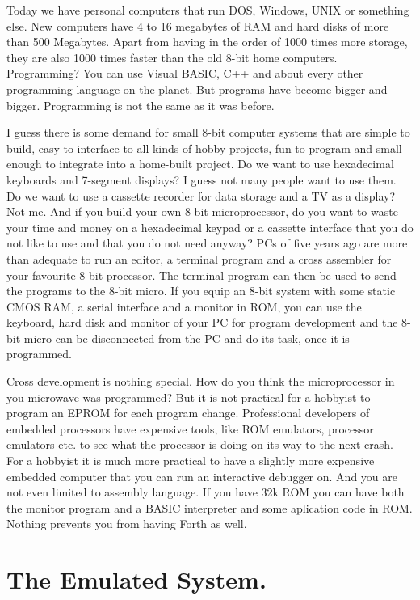 Today we have personal computers that run DOS, Windows, UNIX or something
else. New computers have 4 to 16 megabytes of RAM and hard disks of more
than 500 Megabytes. Apart from having in the order of 1000 times more
storage, they are also 1000 times faster than the old 8-bit home computers. 
Programming? You can use Visual BASIC, C++ and about
every other programming language on the planet. But programs have become
bigger and bigger. Programming is not the same as it was before. 

I guess there is some demand for small 8-bit computer systems that are simple
to build, easy to interface to all kinds of hobby projects, fun to program
and small enough to integrate into a home-built project.
Do we want to use hexadecimal keyboards and 7-segment displays? I guess not
many people want to use them. Do we want to use a cassette recorder for data
storage and a TV as a display? Not me. And if you build your own 8-bit
microprocessor, do you want to waste your time and money on a hexadecimal
keypad or a cassette interface that you do not like to use and that you do
not need anyway? PCs of five years ago are more than adequate to run an
editor, a terminal program and a cross assembler for your favourite 8-bit
processor. The terminal program can then be used to send the programs to the
8-bit micro.
If you equip an 8-bit system with some static CMOS RAM, a serial
interface and a monitor in ROM, you can use the keyboard, hard disk and
monitor of your PC for program development and the 8-bit micro can be
disconnected from the PC and do its task, once it is programmed.

Cross development is nothing special. How do you think the microprocessor in
you microwave was programmed? But it is not practical for a hobbyist to
program an EPROM for each program change. Professional developers of
embedded processors have expensive tools, like ROM emulators, processor
emulators etc. to see what the processor is doing on its way to the next
crash. For a hobbyist it is much more practical to have a slightly more
expensive embedded computer that you can run an interactive debugger on.
And you are not even limited to assembly language. If you have 32k ROM you
can have both the monitor program and a BASIC interpreter and some
aplication code in ROM. Nothing prevents you from having Forth as well.

\section{The Emulated System.}

